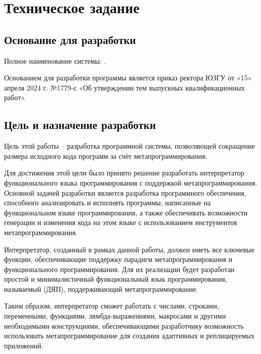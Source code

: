 \section{Техническое задание}
\subsection{Основание для разработки}

Полное наименование системы: .

Основанием для разработки программы является приказ ректора ЮЗГУ от «15» апреля 2024 г. №1779-с «Об утверждении тем выпускных квалификационных работ».

\subsection{Цель и назначение разработки}

Цель этой работы -- разработка программной системы, позволяющей сокращение размера исходного кода программ за счёт метапрограммирования.

Для достижения этой цели было принято решение разработать интерпретатор функционального языка программирования с поддержкой метапрограммирования. Основной задачей разработки является разработка программного обеспечения, способного анализировать и исполнять программы, написанные на функциональном языке программирования, а также обеспечивать возможности генерации и изменения кода на этом языке с использованием инструментов метапрограммирования.

Интерпретатор, созданный в рамках данной работы, должен иметь все ключевые функции, обеспечивающие поддержку парадигм метапрограммирования и функционального программирования. Для их реализации будет разработан простой и минималистичный функциональный язык программирования, называемый  (ДЯП), поддерживающий метапрограммирование.

Таким образом, интерпретатор сможет работать с  числами, строками, переменными, функциями, лямбда-выражениями, макросами и другими необходимыми конструкциями, обеспечивающими разработчику возможность использовать метапрограммирование для создания адаптивных и реплицируемых приложений.

